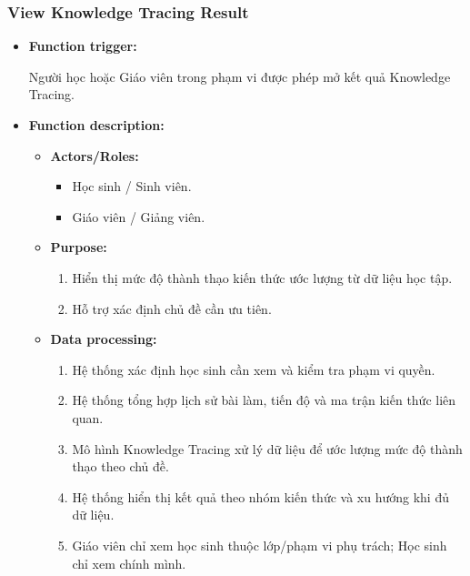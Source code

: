 \documentclass[12pt,a4paper,oneside]{report}
\begin{document}
\subsubsection{View Knowledge Tracing Result}
\label{subsubsec:view-knowledge-tracing}

\begin{itemize}

    \item \textbf{Function trigger:}

    Người học hoặc Giáo viên trong phạm vi được phép mở kết quả Knowledge Tracing.

    \item \textbf{Function description:}

    \begin{itemize}

        \item \textbf{Actors/Roles:}
        \begin{itemize}
            \item Học sinh / Sinh viên.
            \item Giáo viên / Giảng viên.
        \end{itemize}

        \item \textbf{Purpose:}
        \begin{enumerate}
            \item Hiển thị mức độ thành thạo kiến thức ước lượng từ dữ liệu học tập.
            \item Hỗ trợ xác định chủ đề cần ưu tiên.
        \end{enumerate}

        \item \textbf{Data processing:}
        \begin{enumerate}
            \item Hệ thống xác định học sinh cần xem và kiểm tra phạm vi quyền.
            \item Hệ thống tổng hợp lịch sử bài làm, tiến độ và ma trận kiến thức liên quan.
            \item Mô hình Knowledge Tracing xử lý dữ liệu để ước lượng mức độ thành thạo theo chủ đề.
            \item Hệ thống hiển thị kết quả theo nhóm kiến thức và xu hướng khi đủ dữ liệu.
            \item Giáo viên chỉ xem học sinh thuộc lớp/phạm vi phụ trách; Học sinh chỉ xem chính mình.
        \end{enumerate}


\end{itemize}
\end{itemize}
\end{document}
